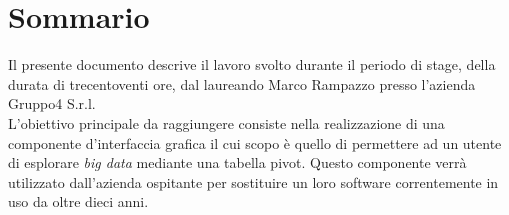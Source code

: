 
\cleardoublepage
{}
{}
\begingroup
\let\clearpage\relax
\let\cleardoublepage\relax
\let\cleardoublepage\relax

\chapter*{Sommario}

Il presente documento descrive il lavoro svolto durante il periodo di stage, della durata di trecentoventi ore, dal laureando Marco Rampazzo presso l'azienda Gruppo4 S.r.l. \\
L'obiettivo principale da raggiungere consiste nella realizzazione di una componente d'interfaccia grafica il cui scopo è quello di permettere ad un utente di esplorare \emph{big data} mediante una tabella pivot. Questo componente verrà utilizzato dall'azienda ospitante per sostituire un loro software correntemente in uso da oltre dieci anni. 

%
%

\endgroup			

\vfill

